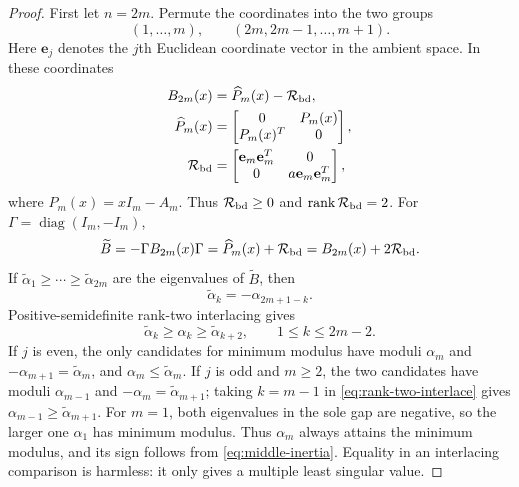 \documentclass[a4paper,preprint,12pt,nopreprintline,sort&compress]{elsarticle}
\numberwithin{equation}{section}
\theoremstyle{remark}
\DeclareMathOperator{\diag}{diag}
\begin{document}
\begin{proof}
First let \(n=2m\).  Permute the coordinates into the two groups
\[
 (1,\ldots,m),\qquad(2m,2m-1,\ldots,m+1).
\]
Here \(\mathbf e_j\) denotes the \(j\)th Euclidean coordinate vector in
the ambient space.  In these coordinates
\begin{equation}\label{eq:even-dilation}
\begin{aligned}
 B_{2m}(x)&=\widehat P_m(x)-\mathcal R_{\rm bd},\\
 \widehat P_m(x)&=\begin{bmatrix}0&P_m(x)\\P_m(x)^T&0\end{bmatrix},\\
 \mathcal R_{\rm bd}
 &=\begin{bmatrix}\mathbf e_m\mathbf e_m^T&0\\
 0&a \mathbf e_m\mathbf e_m^T\end{bmatrix},
\end{aligned}
\end{equation}
where \(P_m(x)=xI_m-A_m\).  Thus \(\mathcal R_{\rm bd}\geq0\) and
\(\operatorname{rank}\mathcal R_{\rm bd}=2\).  For
\(\Gamma=\diag(I_m,-I_m)\),
\[
 \widetilde B=-\Gamma B_{2m}(x)\Gamma
 =\widehat P_m(x)+\mathcal R_{\rm bd}
 =B_{2m}(x)+2\mathcal R_{\rm bd}.
\]
If \(\widetilde\alpha_1\geq\cdots\geq\widetilde\alpha_{2m}\) are the
eigenvalues of
\(\widetilde B\), then
\begin{equation}\label{eq:alpha-reflection}
 \widetilde\alpha_k=-\alpha_{2m+1-k}.
\end{equation}
Positive-semidefinite rank-two interlacing gives
\begin{equation}\label{eq:rank-two-interlace}
 \widetilde\alpha_k\geq\alpha_k\geq\widetilde\alpha_{k+2},
 \qquad1\leq k\leq2m-2.
\end{equation}
If \(j\) is even, the only candidates for minimum modulus
have moduli \(\alpha_m\) and
\(-\alpha_{m+1}=\widetilde\alpha_m\), and
\(\alpha_m\leq\widetilde\alpha_m\).  If \(j\) is odd and \(m\geq2\), the two
candidates have moduli \(\alpha_{m-1}\) and
\(-\alpha_m=\widetilde\alpha_{m+1}\); taking \(k=m-1\) in
\eqref{eq:rank-two-interlace} gives
\(\alpha_{m-1}\geq\widetilde\alpha_{m+1}\).  For \(m=1\), both eigenvalues in
the sole gap are negative, so the larger one \(\alpha_1\) has minimum
modulus.  Thus \(\alpha_m\) always attains the minimum modulus, and its
sign follows from \eqref{eq:middle-inertia}.  Equality in an interlacing
comparison is harmless: it only gives a multiple least singular value.


\end{proof}
\end{document}
